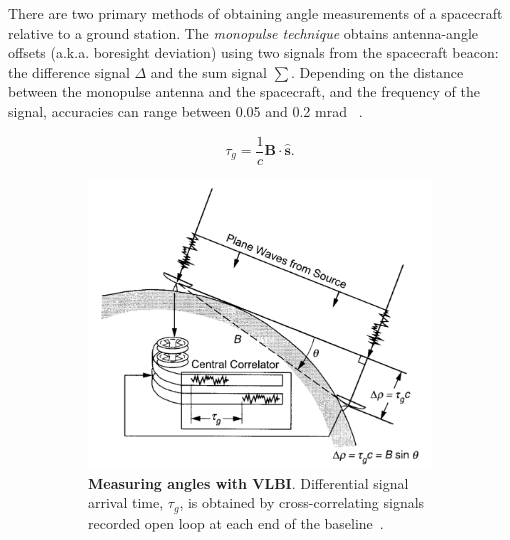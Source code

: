 There are two primary methods of obtaining angle measurements of a spacecraft
relative to a ground station. The \textit{monopulse technique} obtains
antenna-angle offsets (a.k.a. boresight deviation) using two signals from the
spacecraft beacon: the difference signal $\Delta$ and the sum signal $\sum$.
Depending on the distance between the monopulse antenna and the spacecraft, and
the frequency of the signal, accuracies can range between 0.05 and 0.2 mrad
~\cite[p.~196]{Montenbruck2000}.

\begin{equation}
    \tau_g=\frac{1}{c}\bm{B}\cdot{\hat{\bm{s}}}.
    \label{eq:vlbi-vector}
\end{equation}

\begin{figure}
\centering
\begin{subfigure}{.48\textwidth}
  \centering
  \includegraphics[width=.99\linewidth]{graphics/vlbi.PNG}
  \caption{
      \textbf{Measuring angles with VLBI}. Differential signal arrival time,
      $\tau_g$, is obtained by cross-correlating signals recorded open loop at
      each end of the baseline~\cite[p.~48]{Catherine2005}.
  }
  \label{fig:monopulse}
\end{subfigure}\hspace{0.03\textwidth}
\begin{subfigure}{.48\textwidth}
  \centering

\end{subfigure}
\end{figure}
